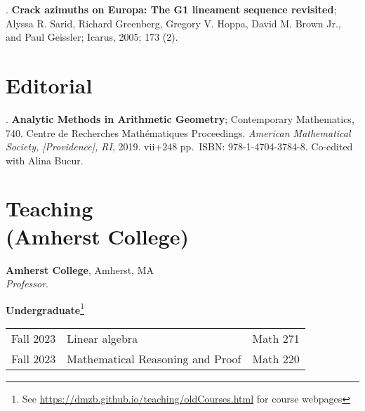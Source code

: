 \documentclass[margin,line]{res}
\newcounter{pubs}
\newcommand{\defi}[1]{\textsf{#1}} 				%
\begin{document}
\begin{resume}
 .  \textbf{Crack azimuths on Europa: The G1 lineament sequence revisited}; Alyssa R. Sarid, Richard Greenberg, Gregory V. Hoppa, David M. Brown Jr., and Paul Geissler; Icarus, 2005; 173 (2). \vspace{.08cm}\\ 


\section{\sc Editorial}


 .  \textbf{Analytic Methods in Arithmetic Geometry}; Contemporary
Mathematics, 740. Centre de Recherches Math\'ematiques Proceedings. \emph{American Mathematical Society, [Providence], RI}, 2019. vii+248 pp.~ISBN: 978-1-4704-3784-8. Co-edited with Alina Bucur. \vspace{.08cm}\\ 


\newpage
\vspace{-7pt}
\section{\sc Teaching \\ (Amherst College)}

{\bf Amherst College}, Amherst, MA\\
\emph{Professor}. 
\vspace{2pt}




{\bf Undergraduate}\footnote{See \url{https://dmzb.github.io/teaching/oldCourses.html} for course webpages}
\vspace*{-.1in}

\begin{tabular}{rll}
 Fall 2023 & \defi{Linear algebra} & Math 271\\  
 Fall 2023 & \defi{Mathematical Reasoning and Proof} & Math 220\\  
\end{tabular}

\vspace{-7pt}

\end{resume}
\end{document}
